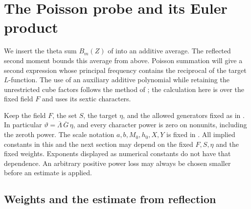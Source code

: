 \section{The Poisson probe and its Euler product}\label{sec:poisson}

We insert the theta sum \(B_m(Z)\) of
 into an additive average.  The reflected
second moment bounds this average from above.  Poisson summation will give a
second expression whose principal frequency contains the reciprocal of the
target \(L\)-function.  The use of an auxiliary additive polynomial while
retaining the unrestricted cube factors follows the method of
\cite[Part~I, \S\S6--7]{QuasiRH}; the calculation here is over the fixed field
\(F\) and uses its sextic characters.

Keep the field \(F\), the set \(S\), the target \(\eta\), and the allowed
generators fixed as in .  In particular
\(\vartheta=\overline\Lambda\,\overline G\,\eta\), and every character power
is zero on nonunits, including the zeroth power.  The scale notation
\(a,b,M_0,h_0,X,Y\) is fixed in .
All implied constants in this and the next section may depend on the fixed
\(F,S,\eta\) and the fixed weights.  Exponents displayed as numerical
constants do not have that dependence.  An arbitrary positive power loss
may always be chosen smaller before an estimate is applied.

\subsection{Weights and the estimate from reflection}

